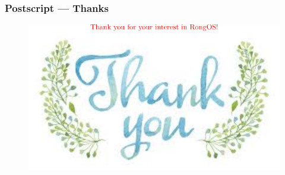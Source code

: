 \documentclass{beamer}
\begin{document}
\begin{frame}
  \frametitle{Postscript — Thanks}
  \begin{figure}
    \includegraphics[scale=.8]{thanks.pdf}
  \end{figure}
  
\end{frame}


 
\end{document}
